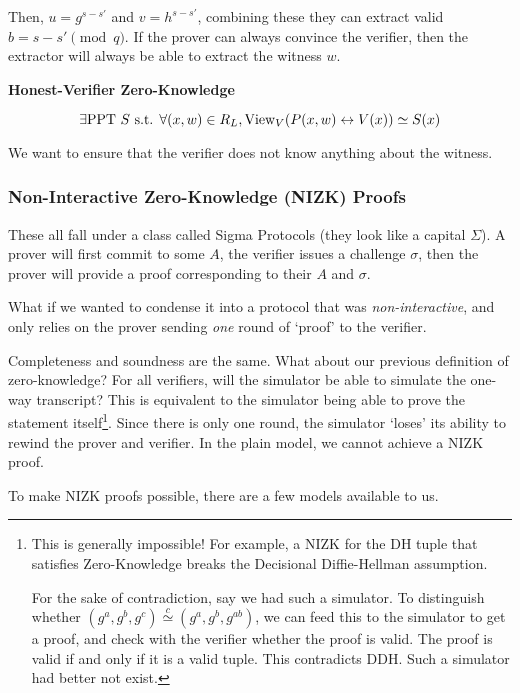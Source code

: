 Then, $u = g^{s-s'}$ and $v = h^{s-s'}$, combining these they can extract valid $b = s-s'\pmod{q}$. If the prover can always convince the verifier, then the extractor will always be able to extract the witness $w$.

\textbf{Honest-Verifier Zero-Knowledge}

\[\exists\mathrm{PPT}\ S\text{ s.t. }\forall(x, w)\in R_L, \mathrm{View}_V(P(x, w)\leftrightarrow V(x))\simeq S(x)\]

We want to ensure that the verifier does not know anything about the witness. 

\subsubsection{Non-Interactive Zero-Knowledge (NIZK) Proofs}
These all fall under a class called Sigma Protocols (they look like a capital $\Sigma$). A prover will first commit to some $A$, the verifier issues a challenge $\sigma$, then the prover will provide a proof corresponding to their $A$ and $\sigma$.

What if we wanted to condense it into a protocol that was \emph{non-interactive}, and only relies on the prover sending \emph{one} round of `proof' to the verifier.


Completeness and soundness are the same. What about our previous definition of zero-knowledge? For all verifiers, will the simulator be able to simulate the one-way transcript? This is equivalent to the simulator being able to prove the statement itself\footnote{This is generally impossible! For example, a NIZK for the DH tuple that satisfies Zero-Knowledge breaks the Decisional Diffie-Hellman assumption.

    For the sake of contradiction, say we had such a simulator. To distinguish whether $(g^a, g^b, g^c)\overset{c}{\simeq}(g^a, g^b, g^{ab})$, we can feed this to the simulator to get a proof, and check with the verifier whether the proof is valid. The proof is valid if and only if it is a valid tuple. This contradicts DDH. Such a simulator had better not exist. }. Since there is only one round, the simulator `loses' its ability to rewind the prover and verifier. In the plain model, we cannot achieve a NIZK proof.

To make NIZK proofs possible, there are a few models available to us.

